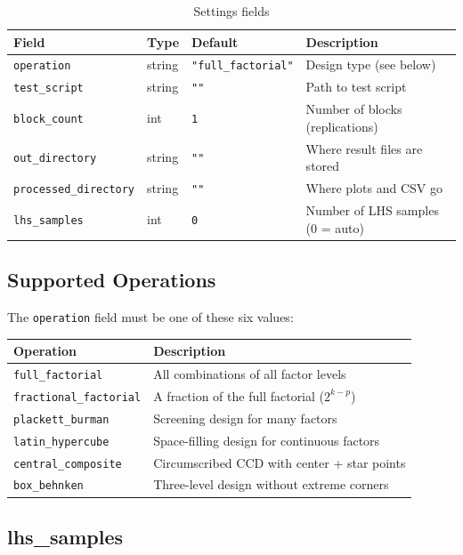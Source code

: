 \documentclass[11pt]{book}
\begin{document}
\begin{table}[H]
\centering
\caption{Settings fields}
\begin{tabular}{@{}lllp{4.5cm}@{}}
\toprule
\textbf{Field} & \textbf{Type} & \textbf{Default} & \textbf{Description} \\
\midrule
\texttt{operation} & string & \texttt{"full\_factorial"} & Design type (see below) \\
\texttt{test\_script} & string & \texttt{""} & Path to test script \\
\texttt{block\_count} & int & \texttt{1} & Number of blocks (replications) \\
\texttt{out\_directory} & string & \texttt{""} & Where result files are stored \\
\texttt{processed\_directory} & string & \texttt{""} & Where plots and CSV go \\
\texttt{lhs\_samples} & int & \texttt{0} & Number of LHS samples (0 = auto) \\
\bottomrule
\end{tabular}
\end{table}

\subsection{Supported Operations}

The \texttt{operation} field must be one of these six values:

\begin{table}[H]
\centering
\begin{tabular}{@{}ll@{}}
\toprule
\textbf{Operation} & \textbf{Description} \\
\midrule
\texttt{full\_factorial} & All combinations of all factor levels \\
\texttt{fractional\_factorial} & A fraction of the full factorial ($2^{k-p}$) \\
\texttt{plackett\_burman} & Screening design for many factors \\
\texttt{latin\_hypercube} & Space-filling design for continuous factors \\
\texttt{central\_composite} & Circumscribed CCD with center + star points \\
\texttt{box\_behnken} & Three-level design without extreme corners \\
\bottomrule
\end{tabular}
\end{table}

\subsection{lhs\_samples}
\end{document}
